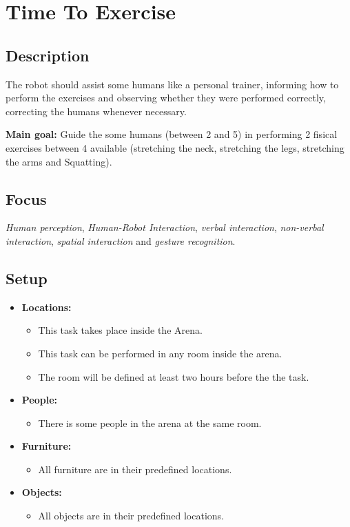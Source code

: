 \section{Time To Exercise}\label{test:time-to-exercise}

\subsection*{Description}
The robot should assist some humans like a personal trainer, informing how to perform the exercises and observing whether they were performed correctly, correcting the humans whenever necessary.

\textbf{Main goal:}
Guide the some humans (between 2 and 5) in performing 2 fisical exercises between 4 available
(stretching the neck, stretching the legs, stretching the arms and Squatting).

\subsection*{Focus}
\emph{Human perception}, 
\emph{Human-Robot Interaction}, 
\emph{verbal interaction}, 
\emph{non-verbal interaction}, 
\emph{spatial interaction} and
\emph{gesture recognition}.

\subsection*{Setup}
\begin{itemize}[nosep]	
	\item \textbf{Locations:} 
	\begin{itemize}
		\item This task takes place inside the Arena.
		\item This task can be performed in any room inside the arena.
		\item The room will be defined at least two hours before the the task.
	\end{itemize}	 
	\item \textbf{People:} 
	\begin{itemize}
		\item There is some people in the arena at the same room.
	\end{itemize}
	\item \textbf{Furniture:}
	\begin{itemize}
		\item All furniture are in their predefined locations.
	\end{itemize}
	\item \textbf{Objects:}
	\begin{itemize}
		\item All objects are in their predefined locations.
	\end{itemize}
\end{itemize}

